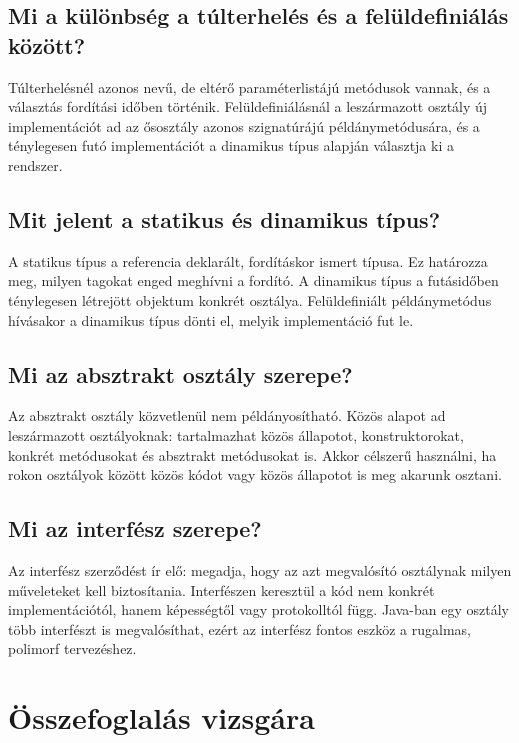 \subsection{Mi a különbség a túlterhelés és a felüldefiniálás között?}

Túlterhelésnél azonos nevű, de eltérő paraméterlistájú metódusok vannak, és a választás fordítási időben történik. Felüldefiniálásnál a leszármazott osztály új implementációt ad az ősosztály azonos szignatúrájú példánymetódusára, és a ténylegesen futó implementációt a dinamikus típus alapján választja ki a rendszer.

\subsection{Mit jelent a statikus és dinamikus típus?}

A statikus típus a referencia deklarált, fordításkor ismert típusa. Ez határozza meg, milyen tagokat enged meghívni a fordító. A dinamikus típus a futásidőben ténylegesen létrejött objektum konkrét osztálya. Felüldefiniált példánymetódus hívásakor a dinamikus típus dönti el, melyik implementáció fut le.

\subsection{Mi az absztrakt osztály szerepe?}

Az absztrakt osztály közvetlenül nem példányosítható. Közös alapot ad leszármazott osztályoknak: tartalmazhat közös állapotot, konstruktorokat, konkrét metódusokat és absztrakt metódusokat is. Akkor célszerű használni, ha rokon osztályok között közös kódot vagy közös állapotot is meg akarunk osztani.

\subsection{Mi az interfész szerepe?}

Az interfész szerződést ír elő: megadja, hogy az azt megvalósító osztálynak milyen műveleteket kell biztosítania. Interfészen keresztül a kód nem konkrét implementációtól, hanem képességtől vagy protokolltól függ. Java-ban egy osztály több interfészt is megvalósíthat, ezért az interfész fontos eszköz a rugalmas, polimorf tervezéshez.

\section{Összefoglalás vizsgára}

